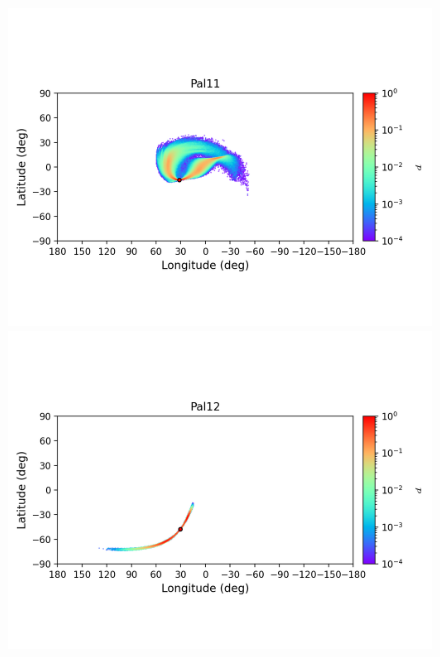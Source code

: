 \begin{figure}
\begin{center}
                \includegraphics[clip=true, trim = 0mm 20mm 0mm 10mm, width=1\columnwidth]{images/error_plots_Pal11.png}
                \includegraphics[clip=true, trim = 0mm 20mm 0mm 10mm, width=1\columnwidth]{images/error_plots_Pal12.png}
                

\end{center}
\end{figure}
